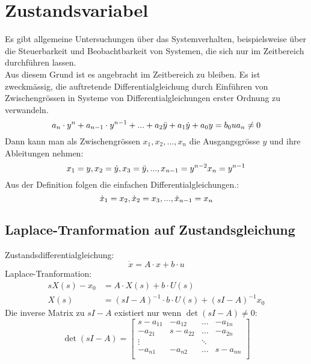 



\section{Zustandsvariabel}
Es gibt allgemeine Untersuchungen über das Systemverhalten, beispielsweise über die Steuerbarkeit und Beobachtbarkeit von Systemen, die sich nur im Zeitbereich durchführen lassen.\\
Aus diesem Grund ist es angebracht im Zeitbereich zu bleiben. Es ist zweckmässig, die auftretende Differentialgleichung durch Einführen von Zwischengrössen in Systeme von Differentialgleichungen erster Ordnung zu verwandeln.
\[
	a_n\cdot y^n+a_{n-1} \cdot y^{n-1}+...+a_2\ddot{y} +a_1\dot{y}+ a_0y=b_0u 
	\\ a_n\neq 0
\]
Dann kann man als Zwischengrössen $x_1,x_2,...,x_n$ die Ausgangsgrösse $y$ und ihre Ableitungen nehmen:
\[
	x_1=y,	\\	x_2=\dot{y},	\\ x_3=\ddot{y},...,	\\x_{n-1}=y^{n-2}	\\	x_n=y^{n-1}
\]
Aus der Definition folgen die einfachen Differentialgleichungen.:
\[
	\dot{x}_1=x_2,	\\	\dot{x}_2=x_3	\\,...,	\\ 	\dot{x}_{n-1}=x_n
\]

\subsection{Laplace-Tranformation auf Zustandsgleichung}
Zustandsdifferentialgleichung:
\[
	\dot{x} = A \cdot x + b \cdot u
\]
Laplace-Tranformation:
\[\begin{aligned}
	sX(s)-x_0 &= A \cdot X(s) + b \cdot U(s) \\
	X(s) &= (sI-A)^{-1} \cdot b \cdot U(s) + (sI-A)^{-1}x_0
\end{aligned}\]
Die inverse Matrix zu $sI-A$ existiert nur wenn $\det\left(sI-A\right) \neq 0$:
\[
	\det\left(sI-A\right) =\begin{bmatrix}
		s-a_{11} & -a_{12} & \ldots & -a_{1n}\\
		-a_{21}	 & s-a_{22}& \ldots & -a_{2n} \\
		\vdots	 & 		   & \ddots & \\
		-a_{n1}	 & -a_{n2} & \ldots & s-a_{nn}\\
	\end{bmatrix}
\]